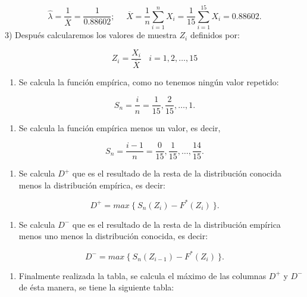 \documentclass[
  a4paper,
  oneside,
  openany]{book}
\providecommand{\tightlist}{%
  \setlength{\itemsep}{0pt}\setlength{\parskip}{0pt}}
\begin{document}
\[\hat{\lambda}=\frac{1}{\overline{X}}=\frac{1}{0.88602}; \ \ \ \ \ \  \overline{X}=\frac{1}{n}\sum_{i=1}^{n}X_{i}=\frac{1}{15}\sum_{i=1}^{15}X_{i}=0.88602.\]
3) Después calcularemos los valores de muestra \(Z_{i}\) definidos por:

\[Z_{i}=\frac{X_{i}}{\overline{X}} \ \ \ \ i=1,2,\ldots,15\]

\begin{enumerate}
\def\labelenumi{\arabic{enumi})}
\setcounter{enumi}{3}
\tightlist
\item
  Se calcula la función empírica, como no tenemos ningún valor repetido:
\end{enumerate}

\[S_{n}= \frac{i}{n}=\frac{1}{15},\frac{2}{15}, \ldots, 1. \]

\begin{enumerate}
\def\labelenumi{\arabic{enumi})}
\setcounter{enumi}{4}
\tightlist
\item
  Se calcula la función empírica menos un valor, es decir,
\end{enumerate}

\[S_{n}= \frac{i-1}{n}=\frac{0}{15},\frac{1}{15}, \ldots, \frac{14}{15}.\]

\begin{enumerate}
\def\labelenumi{\arabic{enumi})}
\setcounter{enumi}{5}
\tightlist
\item
  Se calcula \(D^+\) que es el resultado de la resta de la distribución conocida menos la distribución empírica, es decir:
\end{enumerate}

\[D^+= max \ \{ \ S_{n}(Z_{i})-F^*(Z_{i}) \ \}.\]

\begin{enumerate}
\def\labelenumi{\arabic{enumi})}
\setcounter{enumi}{6}
\tightlist
\item
  Se calcula \(D^-\) que es el resultado de la resta de la distribución empírica menos uno menos la distribución conocida, es decir:
\end{enumerate}

\[D^-= max \  \{\ S_{n}(Z_{i-1})-F^*(Z_{i}) \ \}.\]

\begin{enumerate}
\def\labelenumi{\arabic{enumi})}
\setcounter{enumi}{7}
\tightlist
\item
  Finalmente realizada la tabla, se calcula el máximo de las columnas \(D^+\) y \(D^-\) de ésta manera, se tiene la siguiente tabla:
\end{enumerate}
\end{document}

